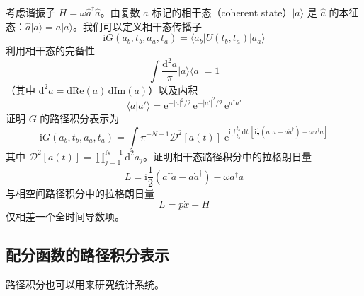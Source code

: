 考虑谐振子 $H = \omega\hat{a}^{\dagger}\hat{a}$。由复数 $a$ 标记的相干态（coherent state）$|a\rangle$ 是 $\hat{a}$ 的本征态：$\hat{a}|a\rangle = a|a\rangle$。我们可以定义相干态传播子
\begin{equation*}
\mathrm{i}G(a_b,t_b,a_a,t_a) = \langle a_b|U(t_b,t_a)|a_a\rangle
\end{equation*}
利用相干态的完备性
\begin{equation*}
\int \frac{\mathrm{d}^2a}{\pi} |a\rangle\langle a| = 1
\end{equation*}
（其中 $\mathrm{d}^2a = \mathrm{d}\mathrm{Re}(a)\,\mathrm{d}\mathrm{Im}(a)$）以及内积
\begin{equation*}
\langle a|a'\rangle = \mathrm{e}^{-|a|^2/2}\,\mathrm{e}^{-|a'|^2/2}\,\mathrm{e}^{a^*a'}
\end{equation*}
证明 $G$ 的路径积分表示为
\begin{equation*}
\mathrm{i}G(a_b,t_b,a_a,t_a) = \int \pi^{-N+1}\mathcal{D}^2[a(t)]\; \mathrm{e}^{\mathrm{i}\int_{t_a}^{t_b}\mathrm{d}t\,[\mathrm{i}\frac{1}{2}(a^{\dagger}\dot{a} - a\dot{a}^{\dagger}) - \omega a^{\dagger}a]}
\end{equation*}
其中 $\mathcal{D}^2[a(t)] = \prod_{j=1}^{N-1}\mathrm{d}^2a_j$。证明相干态路径积分中的拉格朗日量
\begin{equation*}
L = \mathrm{i}\frac{1}{2}(a^{\dagger}\dot{a} - a\dot{a}^{\dagger}) - \omega a^{\dagger}a
\end{equation*}
与相空间路径积分中的拉格朗日量
\begin{equation*}
L = p\dot{x} - H
\end{equation*}
仅相差一个全时间导数项。

\subsection{配分函数的路径积分表示}

\begin{keypoints}
\item 路径积分也可以用来研究统计系统。
\end{keypoints}

